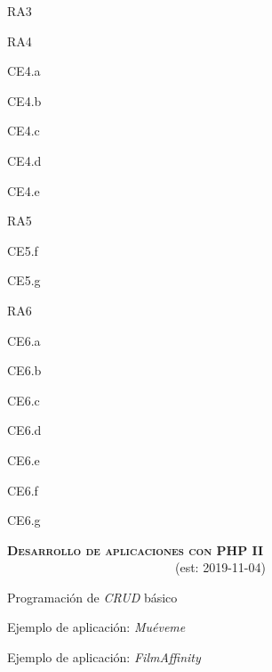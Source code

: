 \begin{longenum}
\begin{longenum}
\begin{longenum}
\begin{longenum}
                \item RA3
                \item RA4
                \begin{longenum}
                    \item CE4.a
                    \item CE4.b
                    \item CE4.c
                    \item CE4.d
                    \item CE4.e
                \end{longenum}
                \item RA5
                \begin{longenum}
                    \item CE5.f
                    \item CE5.g
                \end{longenum}
                \item RA6
                \begin{longenum}
                    \item CE6.a
                    \item CE6.b
                    \item CE6.c
                    \item CE6.d
                    \item CE6.e
                    \item CE6.f
                    \item CE6.g
                \end{longenum}
            \end{longenum}
        \end{longenum}
    \end{longenum}
    \item \textbf{\textsc{Desarrollo de aplicaciones con PHP II}} \ \ \ \ \ \ \ \ \ \ \ \ \ \ \ \ \ \ \ \ \ \ \ \ \ \ \ (est: \mbox{2019-11-04})
    \begin{longenum}
        \item Programación de \textit{CRUD} básico
        \begin{longenum}
            \item Ejemplo de aplicación: \textit{Muéveme}
            \item Ejemplo de aplicación: \textit{FilmAffinity}

\end{longenum}
\end{longenum}
\end{longenum}

